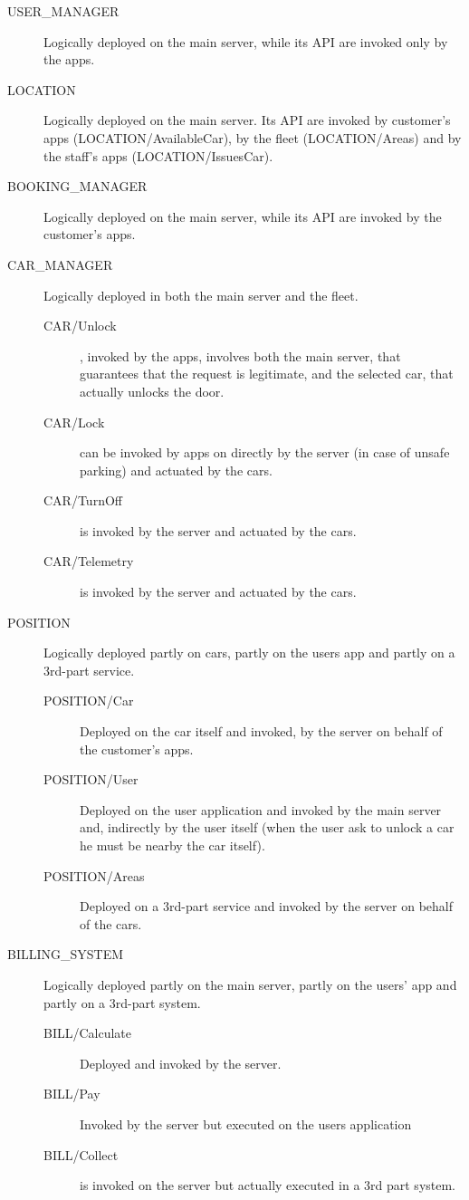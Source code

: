 \documentclass[11pt]{article} %
\begin{document}
\begin{description}
	\item[USER\_MANAGER] Logically deployed on the main server, while its API are invoked only by the apps.
	\item[LOCATION] Logically deployed on the main server. Its API are invoked by customer's apps (LOCATION/AvailableCar), by the fleet (LOCATION/Areas) and by the staff's apps (LOCATION/IssuesCar).
	\item[BOOKING\_MANAGER] Logically deployed on the main server, while its API are invoked by the customer's apps.

	\item[CAR\_MANAGER] Logically deployed in both the main server and the fleet. {\color{red}{Non dovremmo definire due componenti diversi, quello dell'auto e quello del server?}}
	\begin{description}	
		\item[CAR/Unlock], invoked by the apps, involves both the main server, that guarantees that the request is legitimate, and the selected car, that actually unlocks the door.
		\item[CAR/Lock] can be invoked by apps on directly by the server (in case of unsafe parking) and actuated by the cars.
		\item[CAR/TurnOff] is invoked by the server and actuated by the cars.
		\item[CAR/Telemetry]
 is invoked by the server and actuated by the cars.
	\end{description}

	\item[POSITION] Logically deployed partly on cars, partly on the users app and partly on a 3rd-part service. 
	\begin{description}
		\item[POSITION/Car] Deployed on the car itself and invoked, by the server on behalf of the customer's apps. 
		\item[POSITION/User] Deployed on the user application and invoked by the main server and, indirectly by the user itself (when the user ask to unlock a car he must be nearby the car itself). 
		\item[POSITION/Areas] Deployed on a 3rd-part service and invoked by the server on behalf of the cars.
	\end{description}

	\item[BILLING\_SYSTEM] Logically deployed partly on the main server, partly on the users' app and partly on a 3rd-part system. 
		\begin{description}
		\item[BILL/Calculate] Deployed and invoked by the server. 
		\item[BILL/Pay] Invoked by the server but executed on the users application
		\item[BILL/Collect] is invoked on the server but actually executed in a 3rd part system.
		\end{description}


\end{description}
\end{document}
